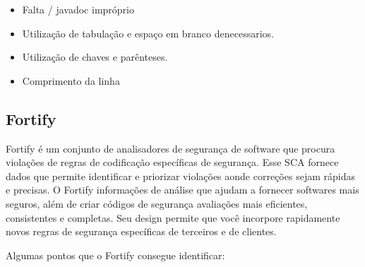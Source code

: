 \documentclass[12pt]{article}
\begin{document}
\begin{itemize}
 \item Falta / javadoc impróprio
 \item Utilização de tabulação e espaço em branco denecessarios.
 \item Utilização de chaves e parênteses.
 \item Comprimento da linha
\end{itemize} 

\subsection{Fortify} \label{sec:fortify}
Fortify\cite{FORTIFY} é um conjunto de analisadores de segurança de software que procura violações de regras de codificação específicas de segurança. Esse SCA fornece dados que permite identificar e priorizar violações aonde correções sejam rápidas e precisas.
O Fortify informações de análise que ajudam a fornecer softwares mais seguros, além de criar códigos de segurança avaliações mais eficientes, consistentes e completas. Seu design permite que você incorpore rapidamente novos regras de segurança específicas de terceiros e de clientes.

Algumas pontos que o Fortify consegue identificar\cite{OWASP}:
\end{document}
